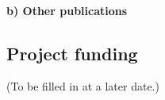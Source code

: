 \documentclass[11pt]{article}
\begin{document}

\nocite{StevensEtAl2017}
\nocite{TonhauserEtAl2013}
\nocite{TonhauserEtAl2018}
\nocite{DeMarneffeEtAl2019}
\nocite{Tonhauser2012}
\nocite{DegenTonhauserMS}
\nocite{KiparskyTonhauser2013}

\nocite{MalsburgEtAl2020}
\nocite{MalsburgVasishth2013}
\nocite{PaapeEtAl2020}

\printbibliography[heading=none,keyword={TMJT-own}]

\paragraph{b) Other publications}

\printbibliography[heading=none,keyword={TMJT-own-other}]

\subsection{Project funding} %

(To be filled in at a later date.)
\end{document}
